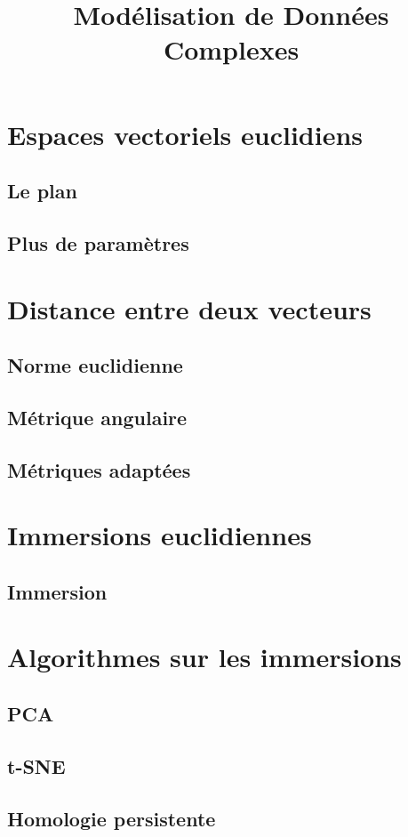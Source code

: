 \documentclass[info, math]{cours}
\title{Modélisation de Données Complexes}
\begin{document}
\section{Espaces vectoriels euclidiens}
\subsection{Le plan}

\subsection{Plus de paramètres}

\section{Distance entre deux vecteurs}
\subsection{Norme euclidienne}

\subsection{Métrique angulaire}

\subsection{Métriques adaptées}

\section{Immersions euclidiennes}
\subsection{Immersion}


\section{Algorithmes sur les immersions}
\subsection{PCA}

\subsection{t-SNE}

\subsection{Homologie persistente}
\end{document}

